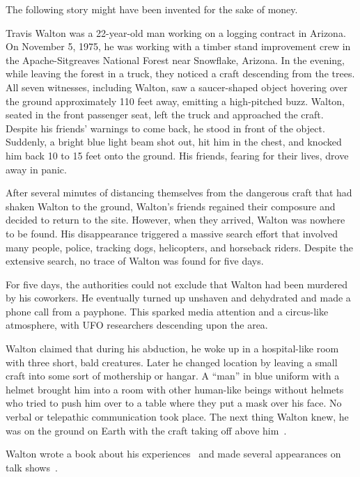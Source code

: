 The following story might have been invented for the sake of money.

Travis Walton was a 22-year-old man working on a logging contract in Arizona.
On November 5, 1975, he was working with a timber stand improvement crew in the Apache-Sitgreaves National Forest near Snowflake, Arizona.
In the evening, while leaving the forest in a truck, they noticed a craft descending from the trees.
All seven witnesses, including Walton, saw a saucer-shaped object hovering over the ground approximately 110 feet away,
 emitting a high-pitched buzz.
Walton, seated in the front passenger seat, left the truck and approached the craft.
Despite his friends' warnings to come back, he stood in front of the object.
Suddenly, a bright blue light beam shot out, hit him in the chest, and knocked him back 10 to 15 feet onto the ground.
His friends, fearing for their lives, drove away in panic.

After several minutes of distancing themselves from the dangerous craft that had shaken Walton to the ground, Walton's friends
regained their composure and decided to return to the site. However, when they arrived, Walton was nowhere to be found.
His disappearance triggered a massive search effort that involved many people, police, tracking dogs, helicopters, and horseback riders.
Despite the extensive search, no trace of Walton was found for five days.

For five days, the authorities could not exclude that Walton had been murdered by his coworkers.
He eventually turned up unshaven and dehydrated and made a phone call from a payphone.
This sparked media attention and a circus-like atmosphere, with UFO researchers descending upon the area.

Walton claimed that during his abduction, he woke up in a hospital-like room with three short, bald creatures.
Later he changed location by leaving a small craft into some sort of mothership or hangar. A ``man'' in blue uniform with a helmet
brought him into a room with other human-like beings without helmets
who tried to push him over to a table where they put a mask over his face.
No verbal or telepathic communication took place. The next thing Walton knew,
he was on the ground on Earth with the craft taking off above
him~\cite{WaltonNelson1,WaltonNelson2,Walton1978Jan,DolanDisclosure2018Sep}.

Walton wrote a book about his experiences~\cite{Walton1978Jan} and made several appearances on talk shows~\cite{WaltonPowerfuljre2021Jan}.

